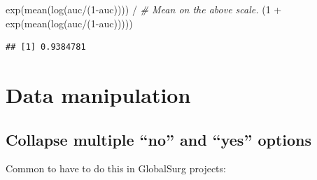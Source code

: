 \documentclass[
]{book}
\newenvironment{Shaded}{\begin{snugshade}}{\end{snugshade}}
\newcommand{\CommentTok}[1]{\textcolor[rgb]{0.56,0.35,0.01}{\textit{#1}}}
\newcommand{\DecValTok}[1]{\textcolor[rgb]{0.00,0.00,0.81}{#1}}
\newcommand{\FunctionTok}[1]{\textcolor[rgb]{0.00,0.00,0.00}{#1}}
\newcommand{\NormalTok}[1]{#1}
\newcommand{\SpecialCharTok}[1]{\textcolor[rgb]{0.00,0.00,0.00}{#1}}
\begin{document}
\begin{Shaded}
\begin{Highlighting}[]
\FunctionTok{exp}\NormalTok{(}\FunctionTok{mean}\NormalTok{(}\FunctionTok{log}\NormalTok{(auc}\SpecialCharTok{/}\NormalTok{(}\DecValTok{1}\SpecialCharTok{{-}}\NormalTok{auc)))) }\SpecialCharTok{/}   \CommentTok{\# Mean on the above scale. }
\NormalTok{  (}\DecValTok{1} \SpecialCharTok{+} \FunctionTok{exp}\NormalTok{(}\FunctionTok{mean}\NormalTok{(}\FunctionTok{log}\NormalTok{(auc}\SpecialCharTok{/}\NormalTok{(}\DecValTok{1}\SpecialCharTok{{-}}\NormalTok{auc)))))}
\end{Highlighting}
\end{Shaded}

\begin{verbatim}
## [1] 0.9384781
\end{verbatim}

\hypertarget{data-manipulation}{%
\chapter{Data manipulation}\label{data-manipulation}}

\hypertarget{collapse-multiple-no-and-yes-options}{%
\section{Collapse multiple ``no'' and ``yes'' options}\label{collapse-multiple-no-and-yes-options}}

Common to have to do this in GlobalSurg projects:
\end{document}
